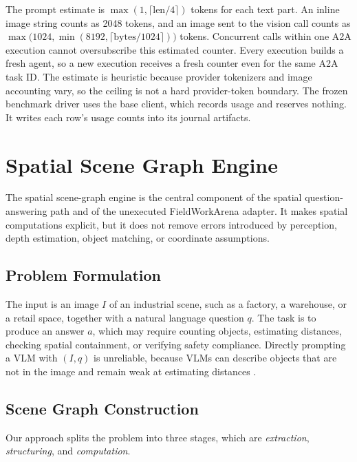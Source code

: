 \documentclass{article}
\begin{document}
The prompt estimate is $\max(1, \lceil \mathrm{len}/4 \rceil)$ tokens for each text part. An inline image string counts as \num{2048} tokens, and an image sent to the vision call counts as $\max\bigl(\num{1024}, \min(\num{8192}, \lceil \mathrm{bytes}/\num{1024} \rceil)\bigr)$ tokens. Concurrent calls within one A2A execution cannot oversubscribe this estimated counter. Every execution builds a fresh agent, so a new execution receives a fresh counter even for the same A2A task ID. The estimate is heuristic because provider tokenizers and image accounting vary, so the ceiling is not a hard provider-token boundary. The frozen benchmark driver uses the base client, which records usage and reserves nothing. It writes each row's usage counts into its journal artifacts.

\section{Spatial Scene Graph Engine}
\label{sec:spatial}

The spatial scene-graph engine is the central component of the spatial question-answering path and of the unexecuted FieldWorkArena adapter. It makes spatial computations explicit, but it does not remove errors introduced by perception, depth estimation, object matching, or coordinate assumptions.

\subsection{Problem Formulation}

The input is an image $I$ of an industrial scene, such as a factory, a warehouse, or a retail space, together with a natural language question $q$. The task is to produce an answer $a$, which may require counting objects, estimating distances, checking spatial containment, or verifying safety compliance. Directly prompting a VLM with $(I, q)$ is unreliable, because VLMs can describe objects that are not in the image \citep{li2023evaluating} and remain weak at estimating distances \citep{chen2024spatialvlm}.

\subsection{Scene Graph Construction}
\label{sec:scenegraph}

Our approach splits the problem into three stages, which are \emph{extraction}, \emph{structuring}, and \emph{computation}.
\end{document}
